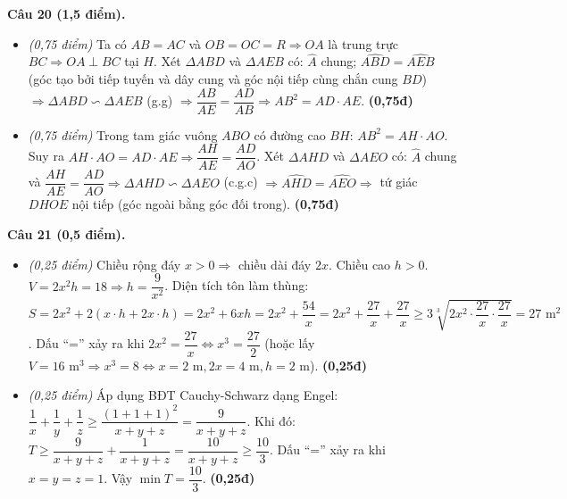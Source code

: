 \documentclass[11pt,a4paper]{article}
\begin{document}
\vspace{1mm}
\textbf{Câu 20 (1,5 điểm).}
\begin{itemize}
  \item[a)] \textit{(0,75 điểm)} Ta có $AB = AC$ và $OB = OC = R \Rightarrow OA$ là trung trực $BC \Rightarrow OA \perp BC$ tại $H$. Xét $\Delta ABD$ và $\Delta AEB$ có: $\widehat{A}$ chung; $\widehat{ABD} = \widehat{AEB}$ (góc tạo bởi tiếp tuyến và dây cung và góc nội tiếp cùng chắn cung $BD$) $\Rightarrow \Delta ABD \backsim \Delta AEB$ (g.g) $\Rightarrow \dfrac{AB}{AE} = \dfrac{AD}{AB} \Rightarrow AB^2 = AD \cdot AE$. \hfill \textbf{(0,75đ)}
  \item[b)] \textit{(0,75 điểm)} Trong tam giác vuông $ABO$ có đường cao $BH$: $AB^2 = AH \cdot AO$. Suy ra $AH \cdot AO = AD \cdot AE \Rightarrow \dfrac{AH}{AE} = \dfrac{AD}{AO}$. Xét $\Delta AHD$ và $\Delta AEO$ có: $\widehat{A}$ chung và $\dfrac{AH}{AE} = \dfrac{AD}{AO} \Rightarrow \Delta AHD \backsim \Delta AEO$ (c.g.c) $\Rightarrow \widehat{AHD} = \widehat{AEO} \Rightarrow$ tứ giác $DHOE$ nội tiếp (góc ngoài bằng góc đối trong). \hfill \textbf{(0,75đ)}
\end{itemize}

\vspace{1mm}
\textbf{Câu 21 (0,5 điểm).}
\begin{itemize}
  \item[a)] \textit{(0,25 điểm)} Chiều rộng đáy $x > 0 \Rightarrow$ chiều dài đáy $2x$. Chiều cao $h > 0$. $V = 2x^2 h = 18 \Rightarrow h = \dfrac{9}{x^2}$. Diện tích tôn làm thùng:
  $S = 2x^2 + 2(x \cdot h + 2x \cdot h) = 2x^2 + 6xh = 2x^2 + \dfrac{54}{x} = 2x^2 + \dfrac{27}{x} + \dfrac{27}{x} \ge 3\sqrt[3]{2x^2 \cdot \dfrac{27}{x} \cdot \dfrac{27}{x}} = 27\text{ m}^2$. Dấu ``='' xảy ra khi $2x^2 = \dfrac{27}{x} \Leftrightarrow x^3 = \dfrac{27}{2}$ (hoặc lấy $V = 16\text{ m}^3 \Rightarrow x^3 = 8 \Leftrightarrow x = 2\text{ m}, 2x = 4\text{ m}, h = 2\text{ m}$). \hfill \textbf{(0,25đ)}
  \item[b)] \textit{(0,25 điểm)} Áp dụng BĐT Cauchy-Schwarz dạng Engel: $\dfrac{1}{x} + \dfrac{1}{y} + \dfrac{1}{z} \ge \dfrac{(1+1+1)^2}{x+y+z} = \dfrac{9}{x+y+z}$. Khi đó:
  $T \ge \dfrac{9}{x+y+z} + \dfrac{1}{x+y+z} = \dfrac{10}{x+y+z} \ge \dfrac{10}{3}$. Dấu ``='' xảy ra khi $x = y = z = 1$. Vậy $\min T = \dfrac{10}{3}$. \hfill \textbf{(0,25đ)}
\end{itemize}
\end{document}
